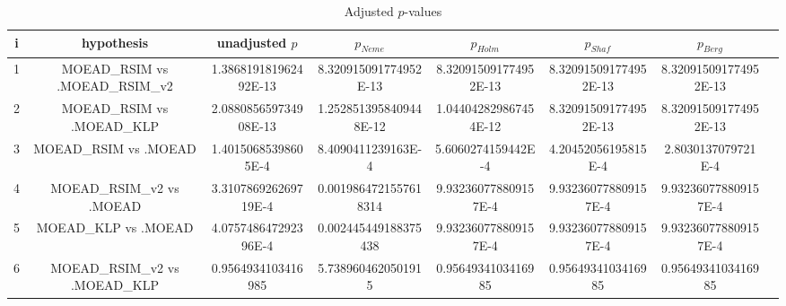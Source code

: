\documentclass[a4paper,10pt]{article}
\begin{document}
\begin{landscape}
\begin{table}[!htp]
\centering\tiny
\caption{Adjusted $p$-values}
\begin{tabular}{cccccccc}
i&hypothesis&unadjusted $p$&$p_{Neme}$&$p_{Holm}$&$p_{Shaf}$&$p_{Berg}$\\
\hline
1&MOEAD_RSIM vs .MOEAD_RSIM_v2&1.386819181962492E-13&8.320915091774952E-13&8.320915091774952E-13&8.320915091774952E-13&8.320915091774952E-13\\
2&MOEAD_RSIM vs .MOEAD_KLP&2.088085659734908E-13&1.2528513958409448E-12&1.044042829867454E-12&8.320915091774952E-13&8.320915091774952E-13\\
3&MOEAD_RSIM vs .MOEAD&1.40150685398605E-4&8.4090411239163E-4&5.6060274159442E-4&4.20452056195815E-4&2.8030137079721E-4\\
4&MOEAD_RSIM_v2 vs .MOEAD&3.310786926269719E-4&0.0019864721557618314&9.932360778809157E-4&9.932360778809157E-4&9.932360778809157E-4\\
5&MOEAD_KLP vs .MOEAD&4.075748647292396E-4&0.002445449188375438&9.932360778809157E-4&9.932360778809157E-4&9.932360778809157E-4\\
6&MOEAD_RSIM_v2 vs .MOEAD_KLP&0.9564934103416985&5.7389604620501915&0.9564934103416985&0.9564934103416985&0.9564934103416985\\
\hline
\end{tabular}
\end{table}

\end{landscape}
\end{document}
